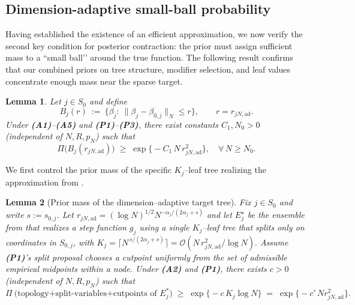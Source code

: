 \documentclass[11pt]{article}
\theoremstyle{plain}
\newtheorem{lemma}{Lemma}
\theoremstyle{definition}
\theoremstyle{plain}
\begin{document}
\subsection{Dimension-adaptive small-ball probability}
Having established the existence of an efficient approximation, we now verify the second key condition for posterior contraction: the prior must assign sufficient mass to a “small ball’’ around the true function. The following result confirms that our combined priors on tree structure, modifier selection, and leaf values concentrate enough mass near the sparse target.

\begin{lemma}
\label{lem:smallball-main}
Let $j\in S_0$ and define
\[
B_j(r)\ :=\ \{\beta_j:\ \|\beta_j-\beta_{0,j}\|_N\le r\},
\qquad r=r_{jN,\mathrm{ad}}.
\]
Under \textbf{(A1)}–\textbf{(A5)} and \textbf{(P1)}–\textbf{(P3)}, there exist constants $C_1,N_0>0$ (independent of $N,R,p_N$) such that
\[
\Pi\big(B_j(r_{jN,\mathrm{ad}})\big)
\;\ge\;
\exp\!\big\{-C_1\,N\,r_{jN,\mathrm{ad}}^2\big\},
\quad \forall\,N\ge N_0.
\]
\end{lemma}

We first control the prior mass of the specific $K_j$–leaf tree realizing the approximation from .

\begin{lemma}[Prior mass of the dimension–adaptive target tree]
\label{lem:tree-mass}
Fix $j\in S_0$ and write $s:=s_{0,j}$. Let $r_{jN,\mathrm{ad}}=(\log N)^{1/2}N^{-\alpha_j/(2\alpha_j+s)}$ and let
$E_j^\star$ be the ensemble from  that realizes a step function $g_j$
using a single $K_j$–leaf tree that splits only on coordinates in $S_{0,j}$, with
\(
K_j=\Big\lceil N^{\,s/(2\alpha_j+s)}\Big\rceil=\mathcal{O} \left({N\,r_{jN,\mathrm{ad}}^2}/{\log N}\right).
\)
Assume {\textbf{(P1)}}’s split proposal chooses a cutpoint \emph{uniformly} from the set of admissible empirical midpoints within a node. Under {\textbf{(A2)}} and {\textbf{(P1)}}, there exists $c>0$ (independent of $N,R,p_N$) such that
\[
  \Pi \ \!\bigl(\text{topology+split-variables+cutpoints of }E^{\!*}_{j}\bigr)
  \;\ge\;
  \exp \bigl\{-c\,K_j\log N\bigr\}
  \;=\;
  \exp\bigl\{-c'\,N r_{jN,\mathrm{ad}}^{2}\bigr\}.
\]
\end{lemma}
\end{document}
